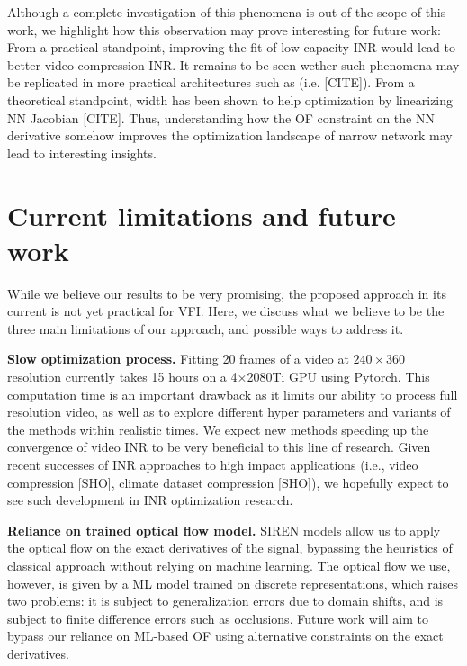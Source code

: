 \documentclass{article}
\begin{document}
Although a complete investigation of this phenomena is out of the scope of this work,
we highlight how this observation may prove interesting for future work:
From a practical standpoint, improving the fit of low-capacity INR would lead to better video compression INR.
It remains to be seen wether such phenomena may be replicated in more practical architectures such as (i.e. [CITE]).
From a theoretical standpoint, width has been shown to help optimization by linearizing NN Jacobian [CITE].
Thus, understanding how the OF constraint on the NN derivative somehow improves
the optimization landscape of narrow network may lead to interesting insights.

\section{Current limitations and future work}
\label{sec_lim}

While we believe our results to be very promising, the proposed approach in its current is not yet practical for VFI.
Here, we discuss what we believe to be the three main limitations of our approach,
and possible ways to address it.

\textbf{Slow optimization process.} Fitting 20 frames of a video at $240 \times 360$ resolution currently takes 15 hours on a 4$\times$2080Ti GPU using Pytorch.
This computation time is an important drawback as it limits our ability to process full resolution video,
 as well as to explore different hyper parameters and variants of the methods within realistic times.
We expect new methods speeding up the convergence of video INR to be very beneficial to this line of research.
Given recent successes of INR approaches to high impact applications (i.e., video compression [SHO], climate dataset compression [SHO]),
we hopefully expect to see such development in INR optimization research.

\textbf{Reliance on trained optical flow model.}
SIREN models allow us to apply the optical flow on the exact derivatives of the signal,
bypassing the heuristics of classical approach without relying on machine learning.
The optical flow we use, however, is given by a ML model trained on discrete representations, which raises two problems:
it is subject to generalization errors due to domain shifts,
and is subject to finite difference errors such as occlusions.
Future work will aim to bypass our reliance on ML-based OF using alternative constraints on the exact derivatives.
\end{document}
